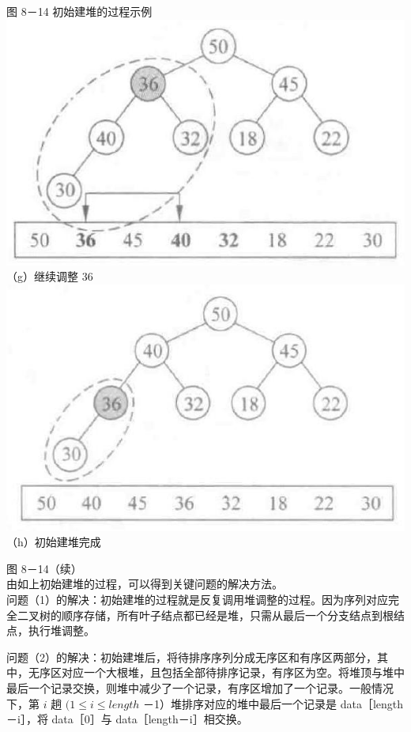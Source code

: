 \documentclass[10pt]{article}
\begin{document}
图 8－14 初始建堆的过程示例\\
\includegraphics[max width=\textwidth, center]{2025_06_06_704745ea57b15b2333e5g-285(1)}\\
（g）继续调整 36\\
\includegraphics[max width=\textwidth, center]{2025_06_06_704745ea57b15b2333e5g-285}\\
（h）初始建堆完成

图 8－14（续）\\
由如上初始建堆的过程，可以得到关键问题的解决方法。\\
问题（1）的解决：初始建堆的过程就是反复调用堆调整的过程。因为序列对应完全二叉树的顺序存储，所有叶子结点都已经是堆，只需从最后一个分支结点到根结点，执行堆调整。

问题（2）的解决：初始建堆后，将待排序序列分成无序区和有序区两部分，其中，无序区对应一个大根堆，且包括全部待排序记录，有序区为空。将堆顶与堆中最后一个记录交换，则堆中减少了一个记录，有序区增加了一个记录。一般情况下，第 $i$ 趟 $(1 \leqslant i \leqslant l e n g t h$ －1）堆排序对应的堆中最后一个记录是 data［length－i］，将 data［0］与 data［length－i］相交换。
\end{document}
